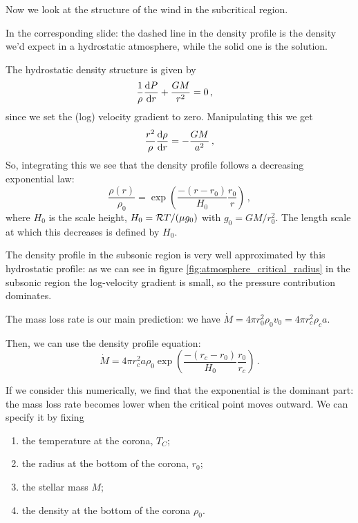 \documentclass[main.tex]{subfiles}
\begin{document}
Now we look at the structure of the wind in the subcritical region.

In the corresponding slide: the dashed line in the density profile is the density we'd expect in a hydrostatic atmosphere, while the solid one is the solution.

The hydrostatic density structure is given by 
%
\begin{subequations}
\begin{align}
  \frac{1}{\rho } \dv{P}{r}  +\frac{GM }{r^2}  &= 0 
\,,
\end{align}
\end{subequations}
%
since we set the (log) velocity gradient to zero.
Manipulating this we get 
%
\begin{equation}
  \frac{r^2}{\rho } \dv{\rho }{r} = - \frac{GM}{a^2}
\,,
\end{equation}
%
So, integrating this we see that the density profile follows a decreasing exponential law: 
%
\begin{equation}
  \frac{\rho (r)}{\rho_0 } = \exp(\frac{-(r-r_0 )}{H_0 } \frac{r_0}{r} ) 
\,,
\end{equation}
%
where \(H_0 \) is the scale height, \(H_0 = \mathcal{R} T / \qty(\mu g_0 )\) with \(g_0 = GM / r_0^2\).
The length scale at which this decreases is defined by \(H_0 \). 

The density profile in the subsonic region is very well approximated by this hydrostatic profile: as we can see in figure \ref{fig:atmosphere_critical_radius} in the subsonic region the log-velocity gradient is small, so the pressure contribution dominates.

The mass loss rate is our main prediction: we have \(\dot{M } = 4 \pi r^2_0 \rho_0 v_0 = 4 \pi r_c^2\rho_c a\).

Then, we can use the density profile equation: 
%
\begin{equation}
  \dot{M} = 4 \pi r_c^2 a \rho_0 \exp(\frac{-(r_c - r_0 )}{H_0 } \frac{r_0 }{r_c}) 
\,.
\end{equation}
%

If we consider this numerically, we find that the exponential is the dominant part: the mass loss rate becomes lower when the critical point moves outward.
We can specify it by fixing 
%
\begin{enumerate}
    \item the temperature at the corona, \(T_C\);
    \item the radius at the bottom of the corona, \(r_0 \);
    \item the stellar mass \(M\);
    \item the density at the bottom of the corona \(\rho_0 \).
\end{enumerate}
\end{document}
